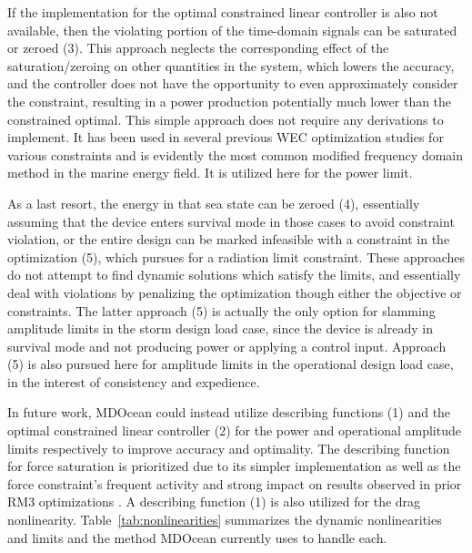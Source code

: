 If the implementation for the optimal constrained linear controller is also not available, then the violating portion of the time-domain signals can be saturated or zeroed (3).
This approach neglects the corresponding effect of the saturation/zeroing on other quantities in the system, which lowers the accuracy, and the controller does not have the opportunity to even approximately consider the constraint, resulting in a power production potentially much lower than the constrained optimal.
This simple approach does not require any derivations to implement.
It has been used in several previous WEC optimization studies for various constraints \cite{garcia-teruel_design_2022,garcia-teruel_reliability-based_2021,cotten_multi-objective_2022,mccabe_constrained_2013} and is evidently the most common modified frequency domain method in the marine energy field.
It is utilized here for the power limit.

As a last resort, the energy in that sea state can be zeroed (4), essentially assuming that the device enters survival mode in those cases to avoid constraint violation, or the entire design can be marked infeasible with a constraint in the optimization (5), which \cite{mccabe_constrained_2013} pursues for a radiation limit constraint.
These approaches do not attempt to find dynamic solutions which satisfy the limits, and essentially deal with violations by penalizing the optimization though either the objective or constraints.
The latter approach (5) is actually the only option for slamming amplitude limits in the storm design load case, since the device is already in survival mode and not producing power or applying a control input.
Approach (5) is also pursued here for amplitude limits in the operational design load case, in the interest of consistency and expedience. 

In future work, MDOcean could instead utilize describing functions (1) and the optimal constrained linear controller (2) for the power and operational amplitude limits respectively to improve accuracy and optimality.
The describing function for force saturation is prioritized due to its simpler implementation as well as the force constraint's frequent activity and strong impact on results observed in prior RM3 optimizations \cite{mccabe_multidisciplinary_2022,gaebele_tpl_2025,mcgilton_optimal_2024}.
A describing function (1) is also utilized for the drag nonlinearity.
Table~\ref{tab:nonlinearities} summarizes the dynamic nonlinearities and limits and the method MDOcean currently uses to handle each.

